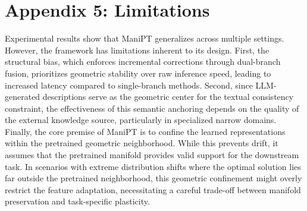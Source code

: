 \documentclass{article}
\theoremstyle{plain}
\theoremstyle{definition}
\theoremstyle{remark}
\begin{document}
	\section{Appendix 5: Limitations}\label{limitations}
	Experimental results show that ManiPT generalizes across multiple settings. However, the framework has limitations inherent to its design. First, the structural bias, which enforces incremental corrections through dual-branch fusion, prioritizes geometric stability over raw inference speed, leading to increased latency compared to single-branch methods. Second, since LLM-generated descriptions serve as the geometric center for the textual consistency constraint, the effectiveness of this semantic anchoring depends on the quality of the external knowledge source, particularly in specialized narrow domains. Finally, the core premise of ManiPT is to confine the learned representations within the pretrained geometric neighborhood. While this prevents drift, it assumes that the pretrained manifold provides valid support for the downstream task. In scenarios with extreme distribution shifts where the optimal solution lies far outside the pretrained neighborhood, this geometric confinement might overly restrict the feature adaptation, necessitating a careful trade-off between manifold preservation and task-specific plasticity.
\end{document}
